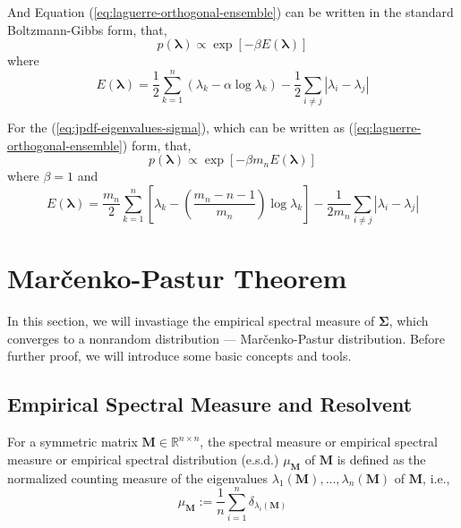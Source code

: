 And Equation (\ref{eq:laguerre-orthogonal-ensemble}) can be written in the standard Boltzmann-Gibbs form, that,
\begin{equation*}
    p\left(\boldsymbol{\lambda}\right)\propto\exp\left[-\beta E\left(\boldsymbol{\lambda}\right)\right]
\end{equation*}
where
\begin{equation}
    E\left(\boldsymbol{\lambda}\right)=\frac{1}{2}\sum_{k=1}^{n}\left(\lambda_{k}-\alpha\log\lambda_{k}\right)-\frac{1}{2}\sum_{i\neq j}\left|\lambda_{i}-\lambda_{j}\right|
\end{equation}

For the (\ref{eq:jpdf-eigenvalues-sigma}), which can be written as (\ref{eq:laguerre-orthogonal-ensemble}) form, that,
\begin{equation*}
    p\left(\boldsymbol{\lambda}\right)\propto\exp\left[-\beta m_{n}E\left(\boldsymbol{\lambda}\right)\right]
\end{equation*}
where $\beta=1$ and
\begin{equation*}
    E\left(\boldsymbol{\lambda}\right)=\frac{m_{n}}{2}\sum_{k=1}^{n}\left[\lambda_{k}-\left(\frac{m_{n}-n-1}{m_{n}}\right)\log\lambda_{k}\right]-\frac{1}{2m_{n}}\sum_{i\neq j}\left|\lambda_{i}-\lambda_{j}\right|
\end{equation*}

\section{Marčenko-Pastur Theorem}

In this section, we will invastiage the empirical spectral measure of $\boldsymbol{\Sigma}$, which converges to a nonrandom distribution --- Marčenko-Pastur distribution. Before further proof, we will introduce some basic concepts and tools.

\subsection*{Empirical Spectral Measure and Resolvent}

\begin{definition}
    For a symmetric matrix $\mathbf{M}\in\mathbb{R}^{n\times n}$, the spectral measure or empirical spectral measure or empirical spectral distribution (e.s.d.) $\mu_{\mathbf{M}}$ of $\mathbf{M}$ is defined as the normalized counting measure of the eigenvalues $\lambda_{1}(\mathbf{M}),\ldots,\lambda_{n}(\mathbf{M})$ of $\mathbf{M}$, i.e.,
    \begin{equation}
        \mu_{\mathbf{M}}:=\frac{1}{n}\sum_{i=1}^{n}\delta_{\lambda_{i}(\mathbf{M})}
    \end{equation}
\end{definition}

